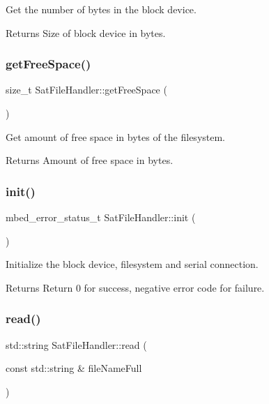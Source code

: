 Get the number of bytes in the block device. 

\begin{DoxyReturn}{Returns}
Size of block device in bytes. 
\end{DoxyReturn}
\mbox{\label{class_sat_file_handler_ae4b0b4244befa3a3d1fdfc451ae248f0}} 
\subsubsection{\texorpdfstring{getFreeSpace()}{getFreeSpace()}}
{\footnotesize\ttfamily size\+\_\+t Sat\+File\+Handler\+::get\+Free\+Space (\begin{DoxyParamCaption}{ }\end{DoxyParamCaption})}



Get amount of free space in bytes of the filesystem. 

\begin{DoxyReturn}{Returns}
Amount of free space in bytes. 
\end{DoxyReturn}
\mbox{\label{class_sat_file_handler_aacd220dabbabf695b7ee32e526baeb5e}} 
\subsubsection{\texorpdfstring{init()}{init()}}
{\footnotesize\ttfamily mbed\+\_\+error\+\_\+status\+\_\+t Sat\+File\+Handler\+::init (\begin{DoxyParamCaption}{ }\end{DoxyParamCaption})}



Initialize the block device, filesystem and serial connection. 

\begin{DoxyReturn}{Returns}
Return 0 for success, negative error code for failure. 
\end{DoxyReturn}
\mbox{\label{class_sat_file_handler_a5529b9e3f7ec6ae60db4c9c83fbe6ea8}} 
\subsubsection{\texorpdfstring{read()}{read()}}
{\footnotesize\ttfamily std\+::string Sat\+File\+Handler\+::read (\begin{DoxyParamCaption}\item[{const std\+::string \&}]{file\+Name\+Full }\end{DoxyParamCaption})}




